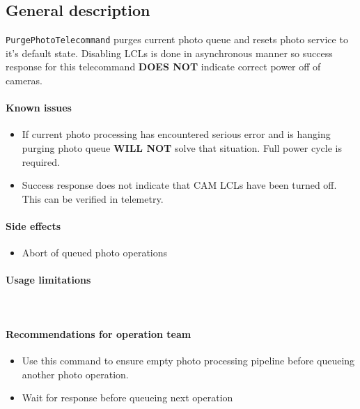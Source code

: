 

\subsection{General description}
\texttt{PurgePhotoTelecommand} purges current photo queue and resets photo service to it's default state. Disabling LCLs is done in asynchronous manner so success response for this telecommand \textbf{DOES NOT} indicate correct power off of cameras.


\paragraph{Known issues}
\begin{itemize}
	\item If current photo processing has encountered serious error and is hanging purging photo queue \textbf{WILL NOT} solve that situation. Full power cycle is required.
	\item Success response does not indicate that CAM LCLs have been turned off. This can be verified in telemetry.
\end{itemize}

\paragraph{Side effects}
\begin{itemize}
	\item Abort of queued photo operations
\end{itemize}

\paragraph{Usage limitations}\mbox{}\\ \None

\paragraph{Recommendations for operation team}
\begin{itemize}
	\item Use this command to ensure empty photo processing pipeline before queueing another photo operation.
	\item Wait for response before queueing next operation
\end{itemize}


